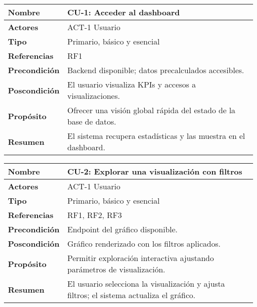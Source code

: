 \begin{table}[H]
    \centering
    \begin{tabular}{|l|p{11cm}|}
        \hline
        \textbf{Nombre} & CU-1: Acceder al dashboard \\
        \hline
        \textbf{Actores} & ACT-1 Usuario \\
        \hline
        \textbf{Tipo} & Primario, básico y esencial \\
        \hline
        \textbf{Referencias} & RF1 \\
        \hline
        \textbf{Precondición} & Backend disponible; datos precalculados accesibles. \\
        \hline
        \textbf{Poscondición} & El usuario visualiza KPIs y accesos a visualizaciones. \\
        \hline
        \textbf{Propósito} & Ofrecer una visión global rápida del estado de la base de datos. \\
        \hline
        \textbf{Resumen} & El sistema recupera estadísticas y las muestra en el dashboard. \\
        \hline
    \end{tabular}
\end{table}

\begin{table}[H]
    \centering
    \begin{tabular}{|l|p{11cm}|}
        \hline
        \textbf{Nombre} & CU-2: Explorar una visualización con filtros \\
        \hline
        \textbf{Actores} & ACT-1 Usuario \\
        \hline
        \textbf{Tipo} & Primario, básico y esencial \\
        \hline
        \textbf{Referencias} & RF1, RF2, RF3 \\
        \hline
        \textbf{Precondición} & Endpoint del gráfico disponible. \\
        \hline
        \textbf{Poscondición} & Gráfico renderizado con los filtros aplicados. \\
        \hline
        \textbf{Propósito} & Permitir exploración interactiva ajustando parámetros de visualización. \\
        \hline
        \textbf{Resumen} & El usuario selecciona la visualización y ajusta filtros; el sistema actualiza el gráfico. \\
        \hline
    \end{tabular}
\end{table}

